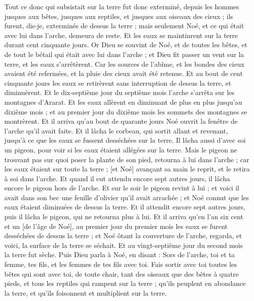 \begin{multicols}{2}
Tout ce donc qui subsistait sur la terre fut donc exterminé, depuis les hommes jusques aux bêtes, jusques aux reptiles, et jusques aux oiseaux des cieux ; ils furent, dis-je, exterminés de dessus la terre ; mais seulement Noé, et ce qui était avec lui dans l'arche, demeura de reste.
Et les eaux se maintinrent sur la terre durant cent cinquante jours.
\VerseOne{}Or Dieu se souvint de Noé, et de toutes les bêtes, et de tout le bétail qui était avec lui dans l'arche ; et Dieu fit passer un vent sur la terre, et les eaux s'arrêtèrent.
Car les sources de l'abîme, et les bondes des cieux avaient été refermées, et la pluie des cieux avait été retenue.
Et au bout de cent cinquante jours les eaux se retirèrent sans interruption de dessus la terre, et diminuèrent.
Et le dix-septième jour du septième mois l'arche s'arrêta sur les montagnes d'Ararat.
Et les eaux allèrent en diminuant de plus en plus jusqu'au dixième mois ; et au premier jour du dixième mois les sommets des montagnes se montrèrent.
Et il arriva qu'au bout de quarante jours Noé ouvrit la fenêtre de l'arche qu'il avait faite.
Et il lâcha le corbeau, qui sortit allant et revenant, jusqu'à ce que les eaux se fussent desséchées sur la terre.
Il lâcha aussi d'avec soi un pigeon, pour voir si les eaux étaient allégées sur la terre.
Mais le pigeon ne trouvant pas sur quoi poser la plante de son pied, retourna à lui dans l'arche ; car les eaux étaient sur toute la terre ; [et Noé] avançant sa main le reprit, et le retira à soi dans l'arche.
Et quand il eut attendu encore sept autres jours, il lâcha encore le pigeon hors de l'arche.
Et sur le soir le pigeon revint à lui ; et voici il avait dans son bec une feuille d'olivier qu'il avait arrachée ; et Noé connut que les eaux étaient diminuées de dessus la terre.
Et il attendit encore sept autres jours, puis il lâcha le pigeon, qui ne retourna plus à lui.
Et il arriva qu'en l'an six cent et un [de l'âge de Noé], au premier jour du premier mois les eaux se furent desséchées de dessus la terre ; et Noé ôtant la couverture de l'arche, regarda, et voici, la surface de la terre se séchait.
Et au vingt-septième jour du second mois la terre fut sèche.
Puis Dieu parla à Noé, en disant :
Sors de l'arche, toi et ta femme, tes fils, et les femmes de tes fils avec toi.
Fais sortir avec toi toutes les bêtes qui sont avec toi, de toute chair, tant des oiseaux que des bêtes à quatre pieds, et tous les reptiles qui rampent sur la terre ; qu'ils peuplent en abondance la terre, et qu'ils foisonnent et multiplient sur la terre.

\end{multicols}
